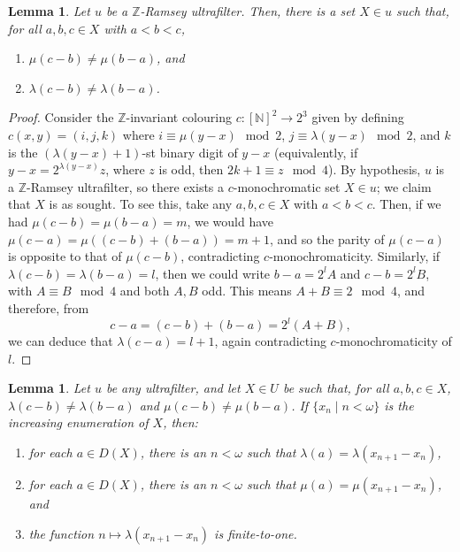 \documentclass{amsart}
\newtheorem{lemma}[theorem]{Lemma}
\theoremstyle{definition}
\theoremstyle{remark}
\numberwithin{equation}{section}
\begin{document}

\begin{lemma}\label{lem:mulambdainjective}
    Let $u$ be a $\mathbb Z$-Ramsey ultrafilter. Then, there is a set $X\in u$ such that, for all $a,b,c\in X$ with $a<b<c$, 
    \begin{enumerate}
        \item $\mu(c-b)\neq\mu(b-a)$, and
        \item $\lambda(c-b)\neq\lambda(b-a)$.
    \end{enumerate}
\end{lemma}

\begin{proof}
    Consider the $\mathbb Z$-invariant colouring $c:[\mathbb N]^2\longrightarrow 2^3$ given by defining $c(x,y)=(i,j,k)$ where $i\equiv\mu(y-x)\mod 2$, $j\equiv\lambda(y-x)\mod 2$, and $k$ is the $(\lambda(y-x)+1)$-st binary digit of $y-x$ (equivalently, if $y-x=2^{\lambda(y-x)}z$, where $z$ is odd, then $2k+1\equiv z\mod 4$). By hypothesis, $u$ is a $\mathbb Z$-Ramsey ultrafilter, so there exists a $c$-monochromatic set $X\in u$; we claim that $X$ is as sought. To see this, take any $a,b,c\in X$ with $a<b<c$. Then, if we had $\mu(c-b)=\mu(b-a)=m$, we would have $\mu(c-a)=\mu((c-b)+(b-a))=m+1$, and so the parity of $\mu(c-a)$ is opposite to that of $\mu(c-b)$, contradicting $c$-monochromaticity. Similarly, if $\lambda(c-b)=\lambda(b-a)=l$, then we could write $b-a=2^lA$ and $c-b=2^lB$, with $A\equiv B\mod 4$ and both $A,B$ odd. This means $A+B\equiv 2\mod 4$, and therefore, from
    \begin{equation*}
        c-a=(c-b)+(b-a)=2^l(A+B),
    \end{equation*}
    we can deduce that $\lambda(c-a)=l+1$, again contradicting $c$-monochromaticity of $l$.
\end{proof}

\begin{lemma}\label{lem:fin-to-one}
    Let $u$ be any ultrafilter, and let $X\in U$ be such that, for all $a,b,c\in X$, $\lambda(c-b)\neq\lambda(b-a)$ and $\mu(c-b)\neq\mu(b-a)$. If $\{x_n \mid n<\omega\}$ is the increasing enumeration of $X$, then:
    \begin{enumerate}
        \item for each $a\in D(X)$, there is an $n<\omega$ such that $\lambda(a)=\lambda(x_{n+1}-x_n)$,
        \item for each $a\in D(X)$, there is an $n<\omega$ such that $\mu(a)=\mu(x_{n+1}-x_n)$, and 
        \item the function $n\longmapsto\lambda(x_{n+1}-x_n)$ is finite-to-one.
    \end{enumerate}
\end{lemma}
\end{document}
